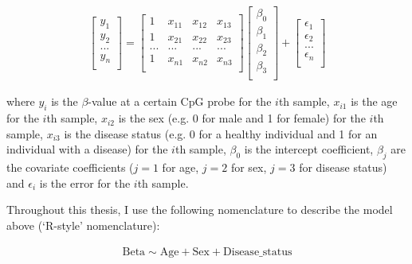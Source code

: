 \begin{align}
\begin{bmatrix}
y_{1} \\
y_{2} \\
... \\
y_{n} \\
\end{bmatrix}
=
\begin{bmatrix}
1 & x_{11}  & x_{12} & x_{13} \\
1 & x_{21} & x_{22} & x_{23} \\
... & ... & ... & ... \\
1& x_{n1} & x_{n2} & x_{n3}  \\
\end{bmatrix}
%
\begin{bmatrix}
\beta_{0} \\
\beta_{1} \\
\beta_{2} \\
\beta_{3} \\
\end{bmatrix}
+
\begin{bmatrix}
\epsilon_{1} \\
\epsilon_{2} \\
... \\
\epsilon_{n} \\
\end{bmatrix}
\end{align}

where $y_i$ is the $\beta$-value at a certain CpG probe for the $i$th sample, $x_{i1}$ is the age for the $i$th sample, $x_{i2}$ is the sex (e.g. 0 for male and 1 for female) for the $i$th sample, $x_{i3}$ is the disease status (e.g. 0 for a healthy individual and 1 for an individual with a disease) for the $i$th sample, $\beta_0$ is the intercept coefficient, $\beta_j$ are the covariate coefficients ($j=1$ for age, $j=2$ for sex, $j=3$ for disease status) and $\epsilon_i$ is the error for the $i$th sample. 

\bigskip

Throughout this thesis, I use the following nomenclature to describe the model above (`R-style' nomenclature):

\begin{align}
\text{Beta} \sim \text{Age}+\text{Sex}+\text{Disease\_status}
\end{align}



